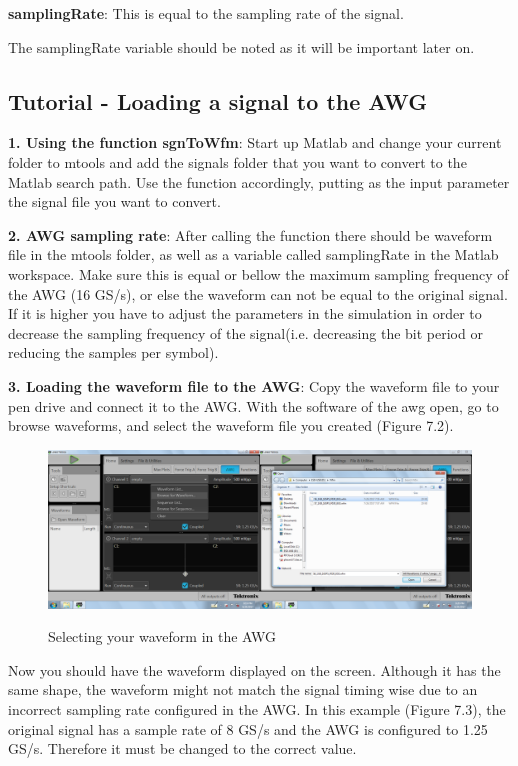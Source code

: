 \textbf{samplingRate}: This is equal to the sampling rate of the signal.
\bigskip

The samplingRate variable  should be noted as it will be important later on.

\subsection*{Tutorial - Loading a signal to the AWG}

\textbf{1. Using the function sgnToWfm}:
Start up Matlab and change your current folder to mtools and add the signals folder that you want to convert to the Matlab search path. Use the function accordingly, putting as the input parameter the signal file you want to convert.


\noindent
\bigskip
\textbf{2. AWG sampling rate}:
After calling the function there should be waveform file in the mtools folder, as well as a variable called samplingRate in the Matlab workspace. Make sure this is equal or bellow the maximum sampling frequency of the AWG (16 GS/s), or else the waveform can not be equal to the original signal. If it is higher you  have to adjust the parameters in the simulation in order to decrease the sampling frequency of the signal(i.e. decreasing the bit period or reducing the samples per symbol).
\bigskip

\noindent
\textbf{3. Loading the waveform file to the AWG}:
Copy the waveform file to your pen drive and connect it to the AWG. With the software of the awg open, go to browse waveforms, and select the waveform file you created (Figure 7.2).

\begin{figure}[h]
	\centering
	\includegraphics[width=\textwidth]{../mtools/sgnToWfm/figures/tutorial1}
	\label{TUT_SelectingWFM}\caption{Selecting your waveform in the AWG}
\end{figure}

Now you should have the waveform displayed on the screen. Although it has the same shape,  the waveform might not match the signal timing wise due to an incorrect sampling rate  configured in the AWG.
In this example (Figure 7.3), the original signal has a sample rate of 8 GS/s and the AWG is configured to 1.25 GS/s. Therefore it must be changed to the correct value.

